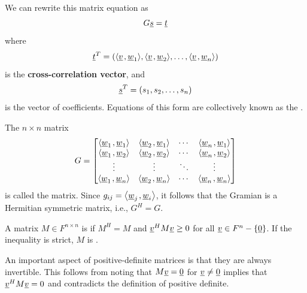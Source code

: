 We can rewrite this matrix equation as
\begin{equation*}
G \underline{s} = \underline{t}
\end{equation*}
where
\begin{equation*}
\underline{t}^T = 
\left(
{\left\langle  \underline{v}  \mskip2mu ,  \underline{w}_1  \right\rangle},
{\left\langle  \underline{v}  \mskip2mu ,  \underline{w}_2  \right\rangle}, \ldots,
{\left\langle  \underline{v}  \mskip2mu ,  \underline{w}_n  \right\rangle} \right)
\end{equation*}
is the \textbf{cross-correlation vector}, and
\begin{equation*}
\underline{s}^T = 
\left( s_1, s_2, \ldots, s_n \right)
\end{equation*}
is the vector of coefficients.
Equations of this form are collectively known as the .

\begin{definition}
The $n \times n$ matrix
\begin{equation} \label{equation:GramianMatrix}
G = \begin{bmatrix}
{\left\langle  \underline{w}_1  \mskip2mu ,  \underline{w}_1  \right\rangle}
& {\left\langle  \underline{w}_2  \mskip2mu ,  \underline{w}_1  \right\rangle} & \cdots
& {\left\langle  \underline{w}_n  \mskip2mu ,  \underline{w}_1  \right\rangle} \\
{\left\langle  \underline{w}_1  \mskip2mu ,  \underline{w}_2  \right\rangle}
& {\left\langle  \underline{w}_2  \mskip2mu ,  \underline{w}_2  \right\rangle} & \cdots
& {\left\langle  \underline{w}_n  \mskip2mu ,  \underline{w}_2  \right\rangle} \\
\vdots & \vdots & \ddots & \vdots \\
{\left\langle  \underline{w}_1  \mskip2mu ,  \underline{w}_n  \right\rangle}
& {\left\langle  \underline{w}_2  \mskip2mu ,  \underline{w}_n  \right\rangle} & \cdots
& {\left\langle  \underline{w}_n  \mskip2mu ,  \underline{w}_n  \right\rangle}
\end{bmatrix}
\end{equation}
is called the  matrix.
Since $g_{ij} = {\left\langle  \underline{w}_j  \mskip2mu ,  \underline{w}_i  \right\rangle}$, it follows that the Gramian is a Hermitian symmetric matrix, i.e., $G^H = G$.
\end{definition}

\begin{definition}
A matrix $M\in F^{n \times n}$ is  if $M^H \!=\! M$ and $\underline{v}^H M \underline{v} \geq 0$ for all $\underline{v} \in F^n - \left\{ \underline{0} \right\}$.
If the inequality is strict, $M$ is .
\end{definition}

An important aspect of positive-definite matrices is that they are always invertible.
This follows from noting that $M\underline{v} = \underline{0}$ for $\underline{v}\neq\underline{0}$ implies that $\underline{v}^H M \underline{v} = 0$ and contradicts the definition of positive definite.

